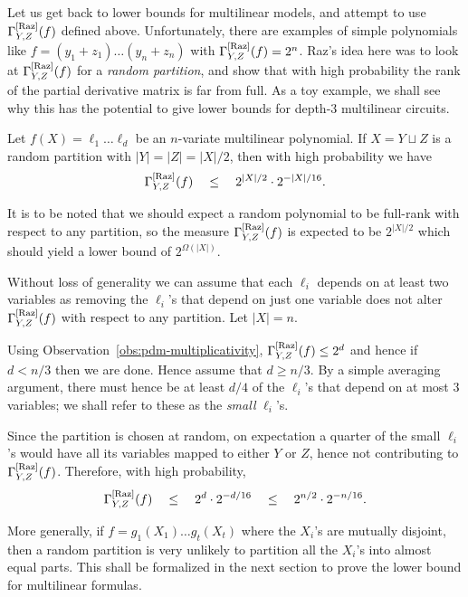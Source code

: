 Let us get back to lower bounds for multilinear models, and attempt to use $\Gamma^{\mathrm{[Raz]}}_{Y,Z}(f)$ defined above. Unfortunately, there are examples of simple polynomials like $f = (y_1 + z_1)\dots (y_n + z_n)$ with $\Gamma^{\mathrm{[Raz]}}_{Y,Z}(f) = 2^n$. Raz's idea here was to look at $\Gamma^{\mathrm{[Raz]}}_{Y,Z}(f)$ for a \emph{random partition}, and show that with high probability the rank of the partial derivative matrix is far from full. As a toy example, we shall see why this has the potential to give lower bounds for depth-$3$ multilinear circuits. 

\begin{lemma}\label{lem:raz-depth-three}
Let $f(X) = \ell_1 \dots \ell_d$ be an $n$-variate multilinear polynomial. If $X = Y\sqcup Z$ is a random partition with $|Y| = |Z| = |X|/2$, then with high probability we have
$$
\Gamma^{\mathrm{[Raz]}}_{Y,Z}(f) \quad \leq \quad 2^{|X|/2} \cdot 2^{-|X|/16}.
$$
\end{lemma}

It is to be noted that we should expect a random polynomial to be full-rank with respect to any partition, so the measure $\Gamma^{\mathrm{[Raz]}}_{Y,Z}(f)$ is expected to be $2^{|X|/2}$ which should yield a lower bound of $2^{\Omega(|X|)}$. 

\begin{proof-sketch}
Without loss of generality we can assume that each $\ell_i$ depends on at least two variables as removing the $\ell_i$'s that depend on just one variable does not alter $\Gamma^{\mathrm{[Raz]}}_{Y,Z}(f)$ with respect to any partition. Let $|X| = n$. 

Using Observation~\ref{obs:pdm-multiplicativity}, $\Gamma^{\mathrm{[Raz]}}_{Y,Z}(f) \leq 2^d$ and hence if $d < n/3$ then we are done. Hence assume that $d \geq n/3$. By a simple averaging argument, there must hence be at least $d/4$ of the $\ell_i$'s that depend on at most $3$ variables; we shall refer to these as the \emph{small} $\ell_i$'s. 

Since the partition is chosen at random, on expectation a quarter of the small $\ell_i$'s would have all its variables mapped to either $Y$ or $Z$, hence not contributing to $\Gamma^{\mathrm{[Raz]}}_{Y,Z}(f)$. Therefore, with high probability,
$$
\Gamma^{\mathrm{[Raz]}}_{Y,Z}(f) \quad \leq \quad 2^{d} \cdot 2^{-d/16} \quad \leq \quad 2^{n/2} \cdot 2^{-n/16}.
$$
\end{proof-sketch}

More generally, if $f = g_1(X_1)\dots g_t(X_t)$ where the $X_i$'s are mutually disjoint, then a random partition is very unlikely to partition all the $X_i$'s into almost equal parts. This shall be formalized in the next section to prove the lower bound for multilinear formulas. 

